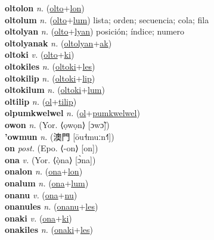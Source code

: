 \textbf{oltolon} \textit{n.} (\hyperref[olto]{olto}+\hyperref[lon]{lon})
 \label{oltolon} \\
\textbf{oltolum} \textit{n.} (\hyperref[olto]{olto}+\hyperref[lum]{lum})
lista; orden; secuencia; cola; fila \label{oltolum} \\
\textbf{oltolyan} \textit{n.} (\hyperref[olto]{olto}+\hyperref[lyan]{lyan})
posición; índice; numero \label{oltolyan} \\
\textbf{oltolyanak} \textit{n.} (\hyperref[oltolyan]{oltolyan}+\hyperref[ak]{ak})
 \label{oltolyanak} \\
\textbf{oltoki} \textit{v.} (\hyperref[olto]{olto}+\hyperref[ki]{ki})
 \label{oltoki} \\
\textbf{oltokiles} \textit{n.} (\hyperref[oltoki]{oltoki}+\hyperref[les]{les})
 \label{oltokiles} \\
\textbf{oltokilip} \textit{n.} (\hyperref[oltoki]{oltoki}+\hyperref[lip]{lip})
 \label{oltokilip} \\
\textbf{oltokilum} \textit{n.} (\hyperref[oltoki]{oltoki}+\hyperref[lum]{lum})
 \label{oltokilum} \\
\textbf{oltilip} \textit{n.} (\hyperref[ol]{ol}+\hyperref[tilip]{tilip})
 \label{oltilip} \\
\textbf{olpumkwelwel} \textit{n.} (\hyperref[ol]{ol}+\hyperref[pumkwelwel]{pumkwelwel})
 \label{olpumkwelwel} \\
\textbf{owon} \textit{n.} (Yor. ⟨ọwọn⟩ [ɔwɔ̃])
 \label{owon} \\
\textbf{'owmun} \textit{n.} ({\chinese{}澳門} [ōu˧muːn˧˥])
 \label{'owmun} \\
\textbf{on} \textit{post.} (Epo. ⟨-on⟩ [on])
 \label{on} \\
\textbf{ona} \textit{v.} (Yor. ⟨ọ̀na⟩ [ɔ̀na])
 \label{ona} \\
\textbf{onalon} \textit{n.} (\hyperref[ona]{ona}+\hyperref[lon]{lon})
 \label{onalon} \\
\textbf{onalum} \textit{n.} (\hyperref[ona]{ona}+\hyperref[lum]{lum})
 \label{onalum} \\
\textbf{onanu} \textit{v.} (\hyperref[ona]{ona}+\hyperref[nu]{nu})
 \label{onanu} \\
\textbf{onanules} \textit{n.} (\hyperref[onanu]{onanu}+\hyperref[les]{les})
 \label{onanules} \\
\textbf{onaki} \textit{v.} (\hyperref[ona]{ona}+\hyperref[ki]{ki})
 \label{onaki} \\
\textbf{onakiles} \textit{n.} (\hyperref[onaki]{onaki}+\hyperref[les]{les})
 \label{onakiles} \\
